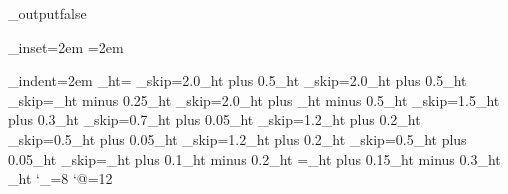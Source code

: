 \def\caption{\setbox\cap_box=\hbox\bgroup
  {\bf\cap_label.}~\ignorespaces}
\def\endCaption{\egroup
  \setbox\box_one=\hbox{\bf\cap_label.\space}%
  \ifx\_ins\tab_ins
    \vbox{\hangindent=\wd\box_one \hangafter=1
      \noindent\unhbox\cap_box}%
  \else
    \dimen_one=\hsize \advance\dimen_one by -2\parindent
    \ifdim\wd\cap_box>\dimen_one
      \vbox{\advance\leftskip by \parindent
      \advance\leftskip by \wd\box_one
      \advance\rightskip by \parindent
      \noindent\kern-\wd\box_one\unhbox\cap_box}
    \else
      \centerline{\unhbox\cap_box}
    \fi
  \fi}

\def\tr_pars{\proc_outputfalse
  \hsize=159mm
  \vsize=690pt
  \let\normalSize=\twelvePoint
  \let\petit=\tenPoint
  \def\titleFont{\seventeenPoint\bf}
  \def\sectionFont{\fourteenPoint\bf}
}

\def\proc_pars{\proc_outputtrue
  \hsize=130mm \hoffset=12mm
  \vsize=516pt \voffset=26.5mm
  \let\normalSize=\tenPoint
  \let\petit=\ninePoint
  \def\titleFont{\fourteenPoint\bf}
  \def\sectionFont{\twelvePoint\bf}
}

\def\parameter_setup{
  \normalSize\rm
  \abs_inset=2em
  \parindent=2em
  \item_indent=2em
  \page_ht=\baselineskip
  \aboveauthors_skip=2.0\page_ht plus 0.5\page_ht
  \belowauthors_skip=2.0\page_ht plus 0.5\page_ht
  \belowabs_skip=\page_ht minus 0.25\page_ht
  \belowkw_skip=2.0\page_ht plus \page_ht minus 0.5\page_ht
  \abovesec_skip=1.5\page_ht plus 0.3\page_ht
  \belowsec_skip=0.7\page_ht plus 0.05\page_ht
  \abovesubsec_skip=1.2\page_ht plus 0.2\page_ht
  \belowsubsec_skip=0.5\page_ht plus 0.05\page_ht
  \abovesss_skip=1.2\page_ht plus 0.2\page_ht
  \belowsss_skip=0.5\page_ht plus 0.05\page_ht
  \cap_skip=\page_ht plus 0.1\page_ht minus 0.2\page_ht
  \skip\footins=\page_ht plus 0.15\page_ht minus 0.3\page_ht
  \dimen\footins=30\page_ht
  \widowpenalty=300
  \def\subsectionFont{\normalSize\bf}
  \def\sssectionFont{\normalSize\bf}
}

\def\trsetup{\tr_pars\parameter_setup}
\def\procsetup{\proc_pars\parameter_setup}


\trsetup\proofMode
\catcode`\_=8 %
\catcode`@=12 %
